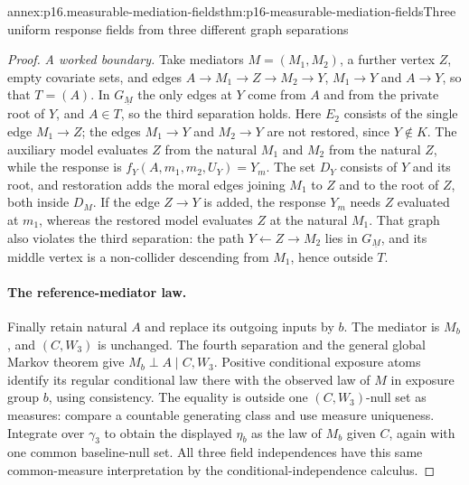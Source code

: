 \begin{annexitem}{annex:p16.measurable-mediation-fields}{thm:p16-measurable-mediation-fields}{Three uniform response fields from three different graph separations}
\begin{proof}
\emph{A worked boundary.} Take mediators \(M=(M_1,M_2)\), a further
vertex \(Z\), empty covariate sets, and edges
\(A\to M_1\to Z\to M_2\to Y\), \(M_1\to Y\) and \(A\to Y\), so
that \(T=(A)\). In \(G_{\underline M}\) the only edges at \(Y\) come
from \(A\) and from the private root of \(Y\), and \(A\in T\), so the
third separation holds. Here \(E_2\) consists of the single edge
\(M_1\to Z\); the edges \(M_1\to Y\) and \(M_2\to Y\) are not
restored, since \(Y\notin K\). The auxiliary model evaluates \(Z\)
from the natural \(M_1\) and \(M_2\) from the natural \(Z\), while
the response is \(f_Y(A,m_1,m_2,U_Y)=Y_m\). The set \(D_Y\) consists
of \(Y\) and its root, and restoration adds the moral edges joining
\(M_1\) to \(Z\) and to the root of \(Z\), both inside \(D_M\). If
the edge \(Z\to Y\) is added, the response \(Y_m\) needs \(Z\)
evaluated at \(m_1\), whereas the restored model evaluates \(Z\) at
the natural \(M_1\). That graph also violates the third separation:
the path \(Y\leftarrow Z\to M_2\) lies in \(G_{\underline M}\), and
its middle vertex is a non-collider descending from \(M_1\), hence
outside \(T\).

\paragraph{The reference-mediator law.}
Finally retain natural \(A\) and replace its outgoing inputs by
\(b\). The mediator is \(M_b\), and \((C,W_3)\) is unchanged.
The fourth separation and the general global Markov theorem give
\(M_b\perp A\mid C,W_3\). Positive conditional exposure atoms
identify its regular conditional law there with the observed law
of \(M\) in exposure group \(b\), using consistency. The equality
is outside one \((C,W_3)\)-null set as measures: compare a countable
generating class and use measure uniqueness. Integrate over
\(\gamma_3\) to obtain the displayed \(\eta_b\) as the law of
\(M_b\) given \(C\), again with one common baseline-null set.
All three field independences have this same common-measure
interpretation by the conditional-independence calculus.
\end{proof}
\end{annexitem}

